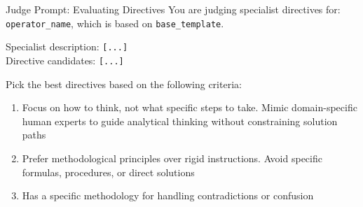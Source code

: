 \documentclass{article} %
\begin{document}
\begin{promptbox}{Judge Prompt: Evaluating Directives}
You are judging specialist directives for: \texttt{{operator\_name}}, which is based on \texttt{{base\_template}}.

\medskip\noindent
Specialist description: \texttt{[...]} \\
Directive candidates: \texttt{[...]}
\medskip

Pick the best directives based on the following criteria:
\begin{enumerate}[leftmargin=*, topsep=2pt, itemsep=0pt]
    \item Focus on how to think, not what specific steps to take. Mimic domain-specific human experts to guide analytical thinking without constraining solution paths
    \item Prefer methodological principles over rigid instructions. Avoid specific formulas, procedures, or direct solutions
    \item Has a specific methodology for handling contradictions or confusion
\end{enumerate}
\end{promptbox}
\end{document}
